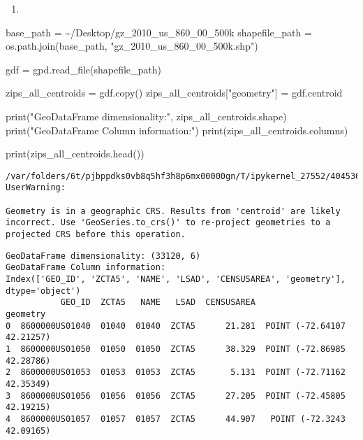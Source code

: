 \documentclass[
  letterpaper,
  DIV=11,
  numbers=noendperiod]{scrartcl}
\newenvironment{Shaded}{\begin{snugshade}}{\end{snugshade}}
\newcommand{\BuiltInTok}[1]{\textcolor[rgb]{0.00,0.23,0.31}{#1}}
\newcommand{\NormalTok}[1]{\textcolor[rgb]{0.00,0.23,0.31}{#1}}
\newcommand{\OperatorTok}[1]{\textcolor[rgb]{0.37,0.37,0.37}{#1}}
\newcommand{\StringTok}[1]{\textcolor[rgb]{0.13,0.47,0.30}{#1}}
\providecommand{\tightlist}{%
  \setlength{\itemsep}{0pt}\setlength{\parskip}{0pt}}\usepackage{longtable,booktabs,array}
\begin{document}
\begin{enumerate}
\def\labelenumi{\arabic{enumi}.}
\tightlist
\item
\end{enumerate}

\begin{Shaded}
\begin{Highlighting}[]
\NormalTok{base\_path }\OperatorTok{=} \StringTok{\textquotesingle{}\textasciitilde{}/Desktop/gz\_2010\_us\_860\_00\_500k\textquotesingle{}}
\NormalTok{shapefile\_path }\OperatorTok{=}\NormalTok{ os.path.join(base\_path, }\StringTok{"gz\_2010\_us\_860\_00\_500k.shp"}\NormalTok{)}

\NormalTok{gdf }\OperatorTok{=}\NormalTok{ gpd.read\_file(shapefile\_path)}

\NormalTok{zips\_all\_centroids }\OperatorTok{=}\NormalTok{ gdf.copy()}
\NormalTok{zips\_all\_centroids[}\StringTok{"geometry"}\NormalTok{] }\OperatorTok{=}\NormalTok{ gdf.centroid}

\BuiltInTok{print}\NormalTok{(}\StringTok{"GeoDataFrame dimensionality:"}\NormalTok{, zips\_all\_centroids.shape)}
\BuiltInTok{print}\NormalTok{(}\StringTok{"GeoDataFrame Column information:"}\NormalTok{)}
\BuiltInTok{print}\NormalTok{(zips\_all\_centroids.columns)}

\BuiltInTok{print}\NormalTok{(zips\_all\_centroids.head())}
\end{Highlighting}
\end{Shaded}

\begin{verbatim}
/var/folders/6t/pjbppdks0vb8q5hf3h8p6mx00000gn/T/ipykernel_27552/4045363704.py:7: UserWarning:

Geometry is in a geographic CRS. Results from 'centroid' are likely incorrect. Use 'GeoSeries.to_crs()' to re-project geometries to a projected CRS before this operation.

\end{verbatim}

\begin{verbatim}
GeoDataFrame dimensionality: (33120, 6)
GeoDataFrame Column information:
Index(['GEO_ID', 'ZCTA5', 'NAME', 'LSAD', 'CENSUSAREA', 'geometry'], dtype='object')
           GEO_ID  ZCTA5   NAME   LSAD  CENSUSAREA                    geometry
0  8600000US01040  01040  01040  ZCTA5      21.281  POINT (-72.64107 42.21257)
1  8600000US01050  01050  01050  ZCTA5      38.329  POINT (-72.86985 42.28786)
2  8600000US01053  01053  01053  ZCTA5       5.131  POINT (-72.71162 42.35349)
3  8600000US01056  01056  01056  ZCTA5      27.205  POINT (-72.45805 42.19215)
4  8600000US01057  01057  01057  ZCTA5      44.907   POINT (-72.3243 42.09165)
\end{verbatim}
\end{document}
